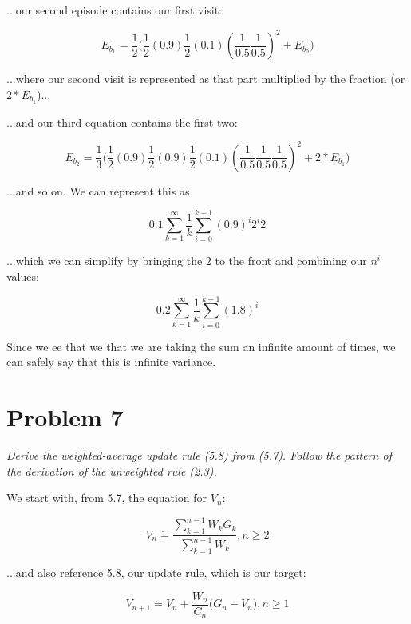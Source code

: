 \documentclass{article}
\begin{document}
...our second episode contains our first visit:

\begin{equation}
    E_{b_1} = \frac{1}{2} \bigg( \frac{1}{2} (0.9) \frac{1}{2} (0.1) (\frac{1}{0.5}\frac{1}{0.5})^2 + E_{b_0} \bigg)
\end{equation}

...where our second visit is represented as that part multiplied by the fraction (or $2*E_{b_1}$)...

...and our third equation contains the first two:

\begin{equation}
    E_{b_2} = \frac{1}{3} \bigg( \frac{1}{2} (0.9)\frac{1}{2} (0.9) \frac{1}{2} (0.1) (\frac{1}{0.5}\frac{1}{0.5}\frac{1}{0.5})^2 + 2*E_{b_1} \bigg)
\end{equation}

...and so on. We can represent this as

\begin{equation}
    0.1 \sum_{k=1}^{\infty}\frac{1}{k} \sum_{i=0}^{k-1} (0.9)^i 2^i 2
\end{equation}

...which we can simplify by bringing the $2$ to the front and combining our $n^i$ values:

\begin{equation}
    0.2 \sum_{k=1}^{\infty}\frac{1}{k} \sum_{i=0}^{k-1} (1.8)^i
\end{equation}

Since we ee that we that we are taking the sum an infinite amount of times, we can safely say that this is infinite variance.

\section*{Problem 7}

\textit{Derive the weighted-average update rule (5.8) from (5.7). Follow the pattern of the derivation of the unweighted rule (2.3).}

We start with, from 5.7, the equation for $V_n$:

\begin{equation}
    V_n \dot{=} \frac{\sum_{k=1}^{n-1}W_k G_k}{\sum_{k=1}^{n-1} W_k}, n \geq 2
\end{equation}

...and also reference 5.8, our update rule, which is our target:

\begin{equation}
    V_{n+1} \dot{=} V_n + \frac{W_n}{C_n}\bigg( G_n-V_n \bigg), n\geq 1
\end{equation}
\end{document}
